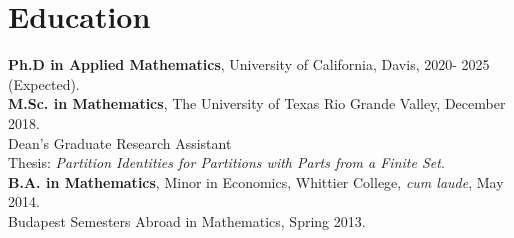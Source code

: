 \documentclass[letterpaper]{article}
\begin{document}
\section*{{\bf Education}}
\textbf{Ph.D in Applied Mathematics}, University of California, Davis, 2020- 2025 (Expected).\\ 
\textbf{M.Sc. in Mathematics}, The University of Texas Rio Grande Valley, December 2018. \\ Dean's Graduate Research Assistant\\ Thesis: \textit{Partition Identities for Partitions with Parts from a Finite Set}. \vspace{.2cm}\\
\textbf{B.A. in Mathematics}, Minor in Economics, Whittier College, {\it cum laude}, May 2014. \vspace{.2cm}\\
Budapest Semesters Abroad in Mathematics, Spring 2013. \\

\vspace{-.1in} 
\end{document}
